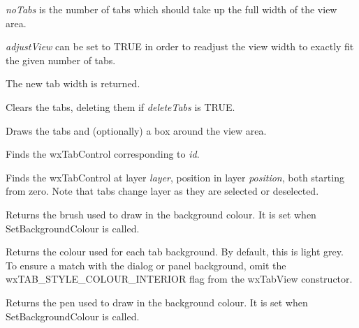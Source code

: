{\it noTabs} is the number of tabs which should take up the full width
of the view area.

{\it adjustView} can be set to TRUE in order to readjust the view width
to exactly fit the given number of tabs. 

The new tab width is returned.



Clears the tabs, deleting them if {\it deleteTabs} is TRUE.



Draws the tabs and (optionally) a box around the view area.



Finds the wxTabControl corresponding to {\it id}.



Finds the wxTabControl at layer {\it layer}, position in layer {\it position}, both starting from
zero. Note that tabs change layer as they are selected or deselected.



Returns the brush used to draw in the background colour. It is set when
SetBackgroundColour is called. 



Returns the colour used for each tab background. By default, this is
light grey. To ensure a match with the dialog or panel background, omit
the wxTAB\_STYLE\_COLOUR\_INTERIOR flag from the wxTabView constructor. 



Returns the pen used to draw in the background colour. It is set when
SetBackgroundColour is called. 

